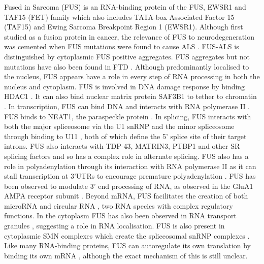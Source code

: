 Fused in Sarcoma (FUS) is an RNA-binding protein of the FUS, EWSR1 and TAF15 (FET) family which also includes TATA-box Associated Factor 15 (TAF15) and Ewing Sarcoma Breakpoint Region 1 (EWSR1).
Although first studied as a fusion protein in cancer, the relevance of FUS to neurodegeneration was cemented when FUS mutations were found to cause ALS \citep{Vance2009-ye, Kwiatkowski2009}. 
FUS-ALS is distinguished by cytoplasmic FUS positive aggregates.
FUS aggregates but not mutations have also been found in FTD \citep{Neumann2009}.
Although predominantly localised to the nucleus, FUS appears have a role in every step of RNA processing in both the nucleus and cytoplasm.
FUS is involved in DNA damage response by binding HDAC1 \citep{Wang2013}.
It can also bind nuclear matrix protein SAF3B1 to tether to chromatin \citep{Yamaguchi2016}. %
In transcription, FUS can bind DNA and interacts with RNA polymerase II \citep{Schwartz2012}. %
FUS binds to NEAT1, the paraspeckle protein \citep{Nishimoto2013}. %
In splicing, FUS interacts with both the major spliceosome via the U1 snRNP \citep{Sun2015a, Yu2015a} and the minor spliceosome through binding to U11 \citep{Reber2016}, both of which define the 5' splice site of their target introns.
FUS also interacts with TDP-43, MATRIN3, PTBP1 and other SR splicing factors \citep{Lagier-Tourenne2012,Yamaguchi2016,Yang1998,Meissner2003} and so has a complex role in alternate splicing.
FUS also has a role in polyadenylation through its interaction with RNA polymerase II as it can stall transcription at 3'UTRs to encourage premature polyadenylation \citep{Masuda2015}. 
FUS has been observed to modulate 3' end processing of RNA, as observed in the GluA1 AMPA receptor subunit \citep{Udagawa2015}. %
Beyond mRNA, FUS facilitates the creation of both microRNA \citep{Morlando2012} and circular RNA \citep{Errichelli2017}, two RNA species with complex regulatory functions.
In the cytoplasm FUS has also been observed in RNA transport granules \citep{Kanai2004, Fujii2005}, suggesting a role in RNA localisation. %
FUS is also present in cytoplasmic SMN complexes which create the spliceosomal snRNP complexes  \citep{Yamazaki2012,Groen2013}.
Like many RNA-binding proteins, FUS can autoregulate its own translation by binding its own mRNA \citep{Zhou2013}, although the exact mechanism of this is still unclear.


